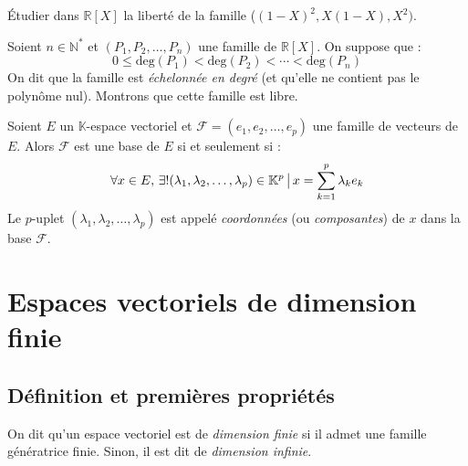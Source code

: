 \documentclass[a4paper,10pt]{report}
\begin{document}
\begin{exa} Étudier dans $\mathbb{R}[X]$ la liberté de la famille ($(1-X)^2,X(1-X),X^2)$.
\end{exa}
\begin{ex} Soient $n \in \mathbb{N}^*$ et $(P_1, P_2, \ldots, P_n)$ une famille de $\mathbb{R}[X]$. On suppose que :
$$ 0 \leq \textrm{deg}(P_1) < \textrm{deg}(P_2) < \cdots < \textrm{deg}(P_n)$$
On dit que la famille est \textit{échelonnée en degré} (et qu'elle ne contient pas le polynôme nul). Montrons que cette famille est libre.

\medskip
%
%

\vspace{9cm}
\end{ex}

\begin{defip} 
Soient $E$ un $\mathbb{K}$-espace vectoriel et $\mathcal{F} = (e_1, e_2, \ldots, e_p)$ une famille de vecteurs de $E$. Alors $\mathcal{F}$ est une base de $E$ si et seulement si :
$$ \forall x \in E, \, \exists  ! (\lambda_1, \lambda_2, \ldots, \lambda_p) \in \mathbb{K}^p \, \big{\vert} \, x = \sum_{k=1}^p \lambda_k e_k$$
Le $p$-uplet $(\lambda_1, \lambda_2, \ldots, \lambda_p)$ est appelé \textit{coordonnées} (ou \textit{composantes}) de $x$ dans la base $\mathcal{F}$.
\end{defip}

\section{Espaces vectoriels de dimension finie}
 \subsection{Définition et premières propriétés}
 \begin{defin} On dit qu'un espace vectoriel est de \textit{dimension finie} si il admet une famille génératrice finie. Sinon, il est dit de \textit{dimension infinie}.
 \end{defin}
 
\end{document}
